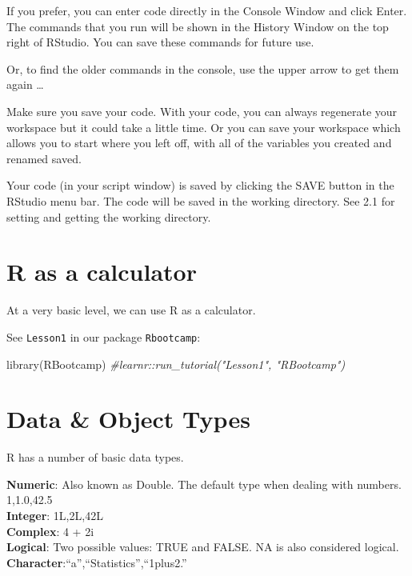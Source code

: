 \documentclass[
]{book}
\newenvironment{Shaded}{\begin{snugshade}}{\end{snugshade}}
\newcommand{\CommentTok}[1]{\textcolor[rgb]{0.56,0.35,0.01}{\textit{#1}}}
\newcommand{\FunctionTok}[1]{\textcolor[rgb]{0.00,0.00,0.00}{#1}}
\newcommand{\NormalTok}[1]{#1}
\theoremstyle{definition}
\theoremstyle{definition}
\theoremstyle{definition}
\theoremstyle{definition}
\theoremstyle{remark}
\begin{document}
If you prefer, you can enter code directly in the Console Window and click Enter. The commands that you run will be shown in the History Window on the top right of RStudio. You can save these commands for future use.

Or, to find the older commands in the console, use the upper arrow to get them again \ldots{}

Make sure you save your code. With your code, you can always regenerate your workspace but it could take a little time. Or you can save your workspace which allows you to start where you left off, with all of the variables you created and renamed saved.

Your code (in your script window) is saved by clicking the SAVE button in the RStudio menu bar. The code will be saved in the working directory. See 2.1 for setting and getting the working directory.

\hypertarget{r-as-a-calculator}{%
\section{R as a calculator}\label{r-as-a-calculator}}

At a very basic level, we can use R as a calculator.

See \texttt{Lesson1} in our package \texttt{Rbootcamp}:

\begin{Shaded}
\begin{Highlighting}[]
\FunctionTok{library}\NormalTok{(RBootcamp)}
\CommentTok{\#learnr::run\_tutorial("Lesson1", "RBootcamp")}
\end{Highlighting}
\end{Shaded}

\hypertarget{data-object-types}{%
\section{Data \& Object Types}\label{data-object-types}}

R has a number of basic data types.

\textbf{Numeric}: Also known as Double. The default type when dealing with numbers. 1,1.0,42.5\\
\textbf{Integer}: 1L,2L,42L\\
\textbf{Complex}: 4 + 2i\\
\textbf{Logical}: Two possible values: TRUE and FALSE. NA is also considered logical.\\
\textbf{Character}:``a'',``Statistics'',``1plus2.''
\end{document}
